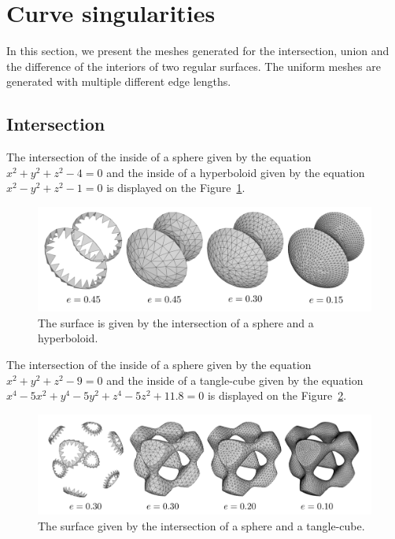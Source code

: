 \section{Curve singularities}
In this section, we present the meshes generated for the intersection, union 
and the difference of the interiors of two regular surfaces.
The uniform meshes are generated with multiple different edge lengths.

\subsection{Intersection}
The intersection of the inside of a sphere given by the equation
$x^2+y^2+z^2-4=0$ and the inside of a hyperboloid given by the 
equation $x^2-y^2+z^2-1=0$ is displayed on the Figure~\ref{img:71}.
\begin{figure}[h!]
    \centerline{\includegraphics[scale=0.5]{images/img71}}
    \caption[The surface given by the intersection of a sphere and a hyperboloid]
    {The surface is given by the intersection of a sphere and a hyperboloid.}
    \label{img:71}
\end{figure}

The intersection of the inside of a sphere given by the equation
$x^2+y^2+z^2-9=0$ and the inside of a tangle-cube given by the 
equation $x^4-5x^2+y^4-5y^2+z^4-5z^2+11.8=0$ is displayed on the Figure~\ref{img:73}.
\begin{figure}[h!]
    \centerline{\includegraphics[scale=0.5]{images/img73}}
    \caption[The surface given by the intersection of a sphere and a tangle-cube]
    {The surface given by the intersection of a sphere and a tangle-cube.}
    \label{img:73}
\end{figure}

